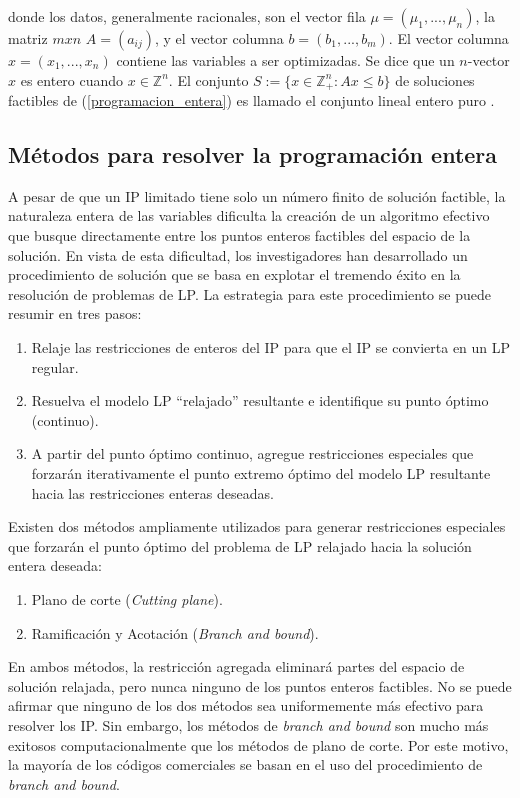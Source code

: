 donde los datos, generalmente racionales, son el vector fila $\mu = (\mu_1,...,\mu_n)$, la matriz $mxn$ $A=(a_{ij})$, y el vector columna $b=(b_1,..., b_m)$. El vector columna $x=(x_1,...,x_n)$ contiene las variables a ser optimizadas. Se dice que un $n$-vector $x$ es entero cuando $x \in \mathbb{Z}^n$. El conjunto $S := \{x \in \mathbb{Z}^n_+ : Ax \leq b\}$ de soluciones factibles de (\ref{programacion_entera}) es llamado el conjunto lineal entero puro \citep{Conforti2014IntegerProgramming}.

\subsection{Métodos para resolver la programación entera}

A pesar de que un IP limitado tiene solo un número finito de solución factible, la naturaleza entera de las variables dificulta la creación de un algoritmo efectivo que busque directamente entre los puntos enteros factibles del espacio de la solución. En vista de esta dificultad, los investigadores han desarrollado un procedimiento de solución que se basa en explotar el tremendo éxito en la resolución de problemas de LP. La estrategia para este procedimiento se puede resumir en tres pasos:

\begin{enumerate}
    \item Relaje las restricciones de enteros del IP para que el IP se convierta en un LP regular.
    \item Resuelva el modelo LP ``relajado'' resultante e identifique su punto óptimo (continuo).
    \item A partir del punto óptimo continuo, agregue restricciones especiales que forzarán iterativamente el punto extremo óptimo del modelo LP resultante hacia las restricciones enteras deseadas.
\end{enumerate}

Existen dos métodos ampliamente utilizados para generar restricciones especiales que forzarán el punto óptimo del problema de LP relajado hacia la solución entera deseada:

\begin{enumerate}
\item Plano de corte (\textit{Cutting plane}).
\item Ramificación y Acotación (\textit{Branch and bound}).
\end{enumerate}

En ambos métodos, la restricción agregada eliminará partes del espacio de solución relajada, pero nunca ninguno de los puntos enteros factibles. No se puede afirmar que ninguno de los dos métodos sea uniformemente más efectivo para resolver los IP. Sin embargo, los métodos de \textit{branch and bound} son mucho más exitosos computacionalmente que los métodos de plano de corte. Por este motivo, la mayoría de los códigos comerciales se basan en el uso del procedimiento de \textit{branch and bound}.

